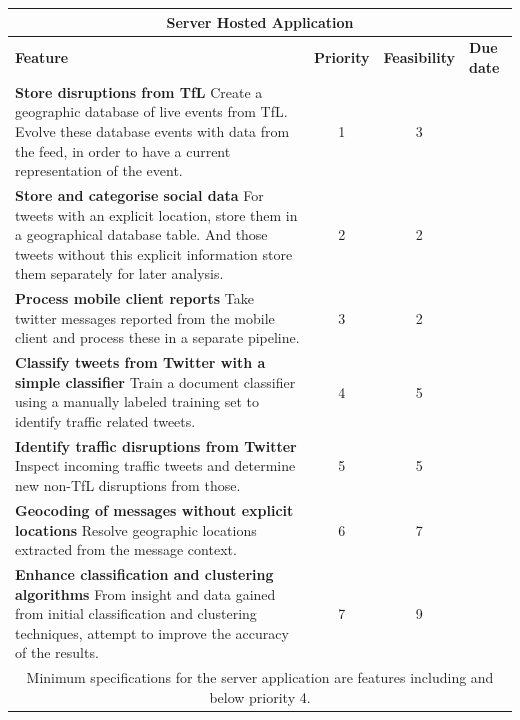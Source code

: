 \begin{center}
\begin{tabular}{ | p{9cm} | c | c | p{1.8cm} | }
\hline
\multicolumn{4}{|c|}{\textbf{Server Hosted Application}} \\ \hline
\textbf{Feature} & \textbf{Priority} & \textbf{Feasibility} & \textbf{Due date} \\ \hline
\textbf{Store disruptions from TfL} \newline
Create a geographic database of live events from TfL. Evolve these database events with data from the feed, in order to have a current representation of the event. & 1 & 3 & \\ \hline
\textbf{Store and categorise social data} \newline
For tweets with an explicit location, store them in a geographical database
table. And those tweets without this explicit information store them separately for later
analysis. & 2 & 2 & \\ \hline
\textbf{Process mobile client reports} \newline
Take twitter messages reported from the mobile client and process these in a
separate pipeline. & 3 & 2 & \\ \hline
\textbf{Classify tweets from Twitter with a simple classifier} \newline
Train a document classifier using a manually labeled training set to 
identify traffic related tweets. & 4 & 5 & \\ \hline
\textbf{Identify traffic disruptions from Twitter} \newline
Inspect incoming traffic tweets and determine new non-TfL disruptions from
those. & 5 & 5 & \\ \hline
\textbf{Geocoding of messages without explicit locations} \newline
Resolve geographic locations extracted from the message context. & 6 & 7 & \\ \hline
\textbf{Enhance classification and clustering algorithms} \newline
From insight and data gained from initial classification and clustering
techniques, attempt to improve the accuracy of the results. & 7 & 9 & \\ \hline
\multicolumn{4}{|c|}{Minimum specifications for the server application are
features including and below priority 4.} \\ \hline
\end{tabular}
\end{center}
